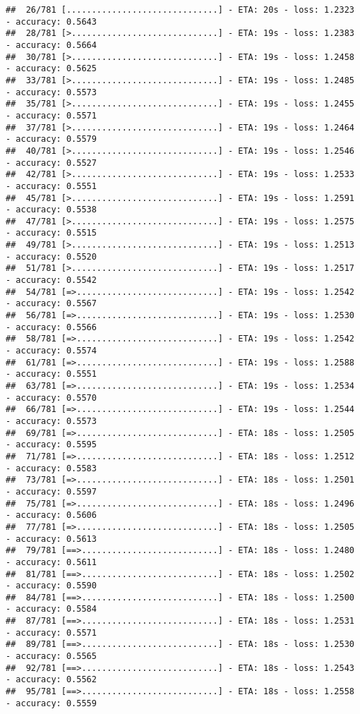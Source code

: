 \documentclass[
]{article}
\begin{document}
\begin{verbatim}
##  26/781 [..............................] - ETA: 20s - loss: 1.2323 - accuracy: 0.5643
##  28/781 [>.............................] - ETA: 19s - loss: 1.2383 - accuracy: 0.5664
##  30/781 [>.............................] - ETA: 19s - loss: 1.2458 - accuracy: 0.5625
##  33/781 [>.............................] - ETA: 19s - loss: 1.2485 - accuracy: 0.5573
##  35/781 [>.............................] - ETA: 19s - loss: 1.2455 - accuracy: 0.5571
##  37/781 [>.............................] - ETA: 19s - loss: 1.2464 - accuracy: 0.5579
##  40/781 [>.............................] - ETA: 19s - loss: 1.2546 - accuracy: 0.5527
##  42/781 [>.............................] - ETA: 19s - loss: 1.2533 - accuracy: 0.5551
##  45/781 [>.............................] - ETA: 19s - loss: 1.2591 - accuracy: 0.5538
##  47/781 [>.............................] - ETA: 19s - loss: 1.2575 - accuracy: 0.5515
##  49/781 [>.............................] - ETA: 19s - loss: 1.2513 - accuracy: 0.5520
##  51/781 [>.............................] - ETA: 19s - loss: 1.2517 - accuracy: 0.5542
##  54/781 [=>............................] - ETA: 19s - loss: 1.2542 - accuracy: 0.5567
##  56/781 [=>............................] - ETA: 19s - loss: 1.2530 - accuracy: 0.5566
##  58/781 [=>............................] - ETA: 19s - loss: 1.2542 - accuracy: 0.5574
##  61/781 [=>............................] - ETA: 19s - loss: 1.2588 - accuracy: 0.5551
##  63/781 [=>............................] - ETA: 19s - loss: 1.2534 - accuracy: 0.5570
##  66/781 [=>............................] - ETA: 19s - loss: 1.2544 - accuracy: 0.5573
##  69/781 [=>............................] - ETA: 18s - loss: 1.2505 - accuracy: 0.5595
##  71/781 [=>............................] - ETA: 18s - loss: 1.2512 - accuracy: 0.5583
##  73/781 [=>............................] - ETA: 18s - loss: 1.2501 - accuracy: 0.5597
##  75/781 [=>............................] - ETA: 18s - loss: 1.2496 - accuracy: 0.5606
##  77/781 [=>............................] - ETA: 18s - loss: 1.2505 - accuracy: 0.5613
##  79/781 [==>...........................] - ETA: 18s - loss: 1.2480 - accuracy: 0.5611
##  81/781 [==>...........................] - ETA: 18s - loss: 1.2502 - accuracy: 0.5590
##  84/781 [==>...........................] - ETA: 18s - loss: 1.2500 - accuracy: 0.5584
##  87/781 [==>...........................] - ETA: 18s - loss: 1.2531 - accuracy: 0.5571
##  89/781 [==>...........................] - ETA: 18s - loss: 1.2530 - accuracy: 0.5565
##  92/781 [==>...........................] - ETA: 18s - loss: 1.2543 - accuracy: 0.5562
##  95/781 [==>...........................] - ETA: 18s - loss: 1.2558 - accuracy: 0.5559

\end{verbatim}
\end{document}
